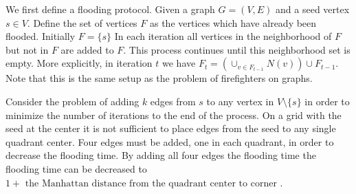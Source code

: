 \documentclass{article}
\begin{document}
We first define a flooding protocol.
Given a graph $G=(V, E)$ and a seed vertex $s \in V$. Define the set of vertices $F$ as the vertices which have already been flooded.
Initially $F = \{ s \}$
In each iteration all vertices in the neighborhood of $F$ but not in $F$ are added to $F$. This process continues until this neighborhood set is empty.
More explicitly, in iteration $t$ we have $F_t = (\cup_{v \in F_{t - 1}} N(v)) \cup F_{t - 1}$.
Note that this is the same setup as the problem of firefighters on graphs.

Consider the problem of adding $k$ edges from $s$ to any vertex in $V \setminus \{s\}$ in order to minimize the number of iterations to the end of the process.
On a grid with the seed at the center it is not sufficient to place edges from the seed to any single quadrant center.
Four edges must be added, one in each quadrant, in order to decrease the flooding time.
By adding all four edges the flooding time the flooding time can be decreased to $1 + \text{ the Manhattan distance from the quadrant center to corner }$.
\end{document}
